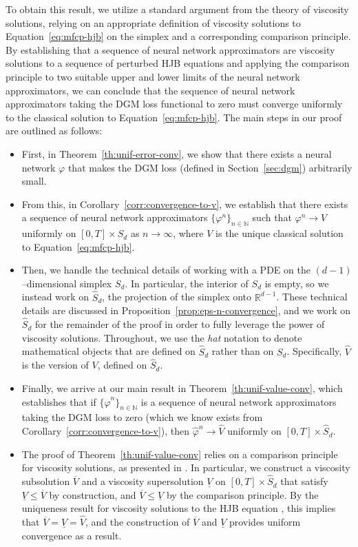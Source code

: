 \documentclass[11pt,reqno]{amsart}
\numberwithin{equation}{section}
\theoremstyle{plain}
\newcommand{\R}{\mathbb{R}}
\newcommand{\N}{\mathbb{N}}
\begin{document}
To obtain this result, we utilize a standard argument from the theory of viscosity solutions, relying on an appropriate definition of viscosity solutions to Equation~\eqref{eq:mfcp-hjb} on the simplex and a corresponding comparison principle. By establishing that a sequence of neural network approximators are viscosity solutions to a sequence of perturbed HJB equations and applying the comparison principle to two suitable upper and lower limits of the neural network approximators, we can conclude that the sequence of neural network approximators taking the DGM loss functional to zero must converge uniformly to the classical solution to Equation~\eqref{eq:mfcp-hjb}. The main steps in our proof are outlined as follows:
\begin{itemize}
    \item First, in Theorem~\ref{th:unif-error-conv}, we show that there exists a neural network $\varphi$ that makes the DGM loss (defined in Section~\ref{sec:dgm}) arbitrarily small. 
    \item From this, in Corollary~\ref{corr:convergence-to-v}, we establish that there exists a sequence of neural network approximators $\{\varphi^n\}_{n \in \N}$ such that $\varphi^n \to V$ uniformly on $[0,T]\times S_d$ as $n \to \infty$, where $V$ is the unique classical solution to Equation~\eqref{eq:mfcp-hjb}.
    \item Then, we handle the technical details of working with a PDE on the $(d-1)$--dimensional simplex $S_d$. In particular, the interior of $S_d$ is empty, so we instead work on $\widehat{S}_d$, the projection of the simplex onto $\R^{d-1}$. These technical details are discussed in Proposition~\ref{prop:eps-n-convergence}, and we work on $\widehat{S}_d$ for the remainder of the proof in order to fully leverage the power of viscosity solutions. Throughout, we use the {\it hat} notation to denote mathematical objects that are defined on $\widehat{S}_d$ rather than on $S_d$. Specifically, $\widehat{V}$ is the version of $V$, defined on $\widehat{S}_d$.
    \item Finally, we arrive at our main result in Theorem~\ref{th:unif-value-conv}, which establishes that if $\{\widehat{\varphi}^n\}_{n \in \N}$ is a sequence of neural network approximators taking the DGM loss to zero (which we know exists from Corollary~\ref{corr:convergence-to-v}), then $\widehat{\varphi}^n \to \widehat{V}$ uniformly on $[0, T] \times \widehat{S}_d$. 
    \item The proof of Theorem~\ref{th:unif-value-conv} relies on a comparison principle for viscosity solutions, as presented in \cite[Theorem 3.3]{visc-users}. In particular, we construct a viscosity subsolution $\overline{V}$ and a viscosity supersolution $\underline{V}$ on $[0, T] \times \widehat{S}_d$ that satisfy $\underline{V} \leq \overline{V}$ by construction, and $\overline{V} \leq \underline{V}$ by the comparison principle. By the uniqueness result for viscosity solutions to the HJB equation \cite[Theorem 9]{mfcp}, this implies that $ \overline{V} = \underline{V} = \widehat{V}$, and the construction of $\overline{V}$ and $\underline{V}$ provides uniform convergence as a result. 
\end{itemize}
\end{document}
